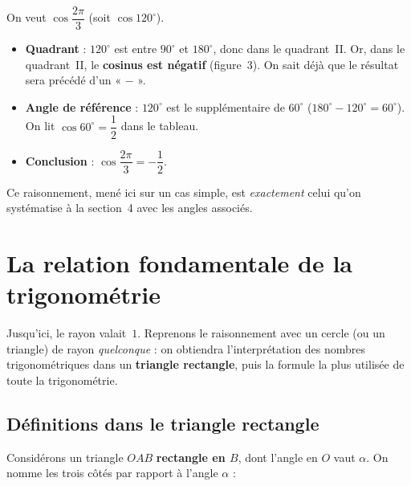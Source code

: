 \documentclass[11pt,a4paper]{article}
\newcommand{\degr}{^{\circ}}
\begin{document}
\begin{exemple}
On veut $\cos\dfrac{2\pi}{3}$ (soit $\cos120\degr$).
\begin{itemize}[leftmargin=1.4em,topsep=2pt,itemsep=1pt]
  \item \textbf{Quadrant} : $120\degr$ est entre $90\degr$ et $180\degr$, donc dans le quadrant~II.
        Or, dans le quadrant~II, le \textbf{cosinus est négatif} (figure~3). On sait déjà que le
        résultat sera précédé d'un « $-$ ».
  \item \textbf{Angle de référence} : $120\degr$ est le supplémentaire de $60\degr$
        ($180\degr-120\degr=60\degr$). On lit $\cos60\degr=\dfrac12$ dans le tableau.
  \item \textbf{Conclusion} : $\cos\dfrac{2\pi}{3}=-\dfrac12$.
\end{itemize}
Ce raisonnement, mené ici sur un cas simple, est \emph{exactement} celui qu'on systématise à la
section~4 avec les angles associés.
\end{exemple}

\section{La relation fondamentale de la trigonométrie}
Jusqu'ici, le rayon valait~$1$. Reprenons le raisonnement avec un cercle (ou un triangle) de rayon
\emph{quelconque} : on obtiendra l'interprétation des nombres trigonométriques dans un
\textbf{triangle rectangle}, puis la formule la plus utilisée de toute la trigonométrie.

\subsection{Définitions dans le triangle rectangle}
Considérons un triangle $OAB$ \textbf{rectangle en $B$}, dont l'angle en $O$ vaut $\alpha$.
On nomme les trois côtés par rapport à l'angle $\alpha$ :
\end{document}
